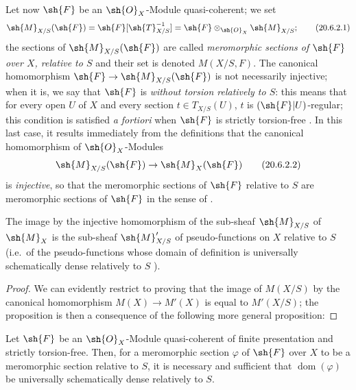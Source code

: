 \begin{env}[20.6.2]
\label{IV.20.6.2}
Let now $\sh{F}$ be an $\sh{O}_X$-Module quasi-coherent;
we set
\[
\label{IV.20.6.2.1}
  \sh{M}_{X/S}(\sh{F})=\sh{F}[\sh{T}_{X/S}^{-1}]=\sh{F}\otimes_{\sh{O}_X}\sh{M}_{X/S};
  \tag{20.6.2.1}
\]
the sections of $\sh{M}_{X/S}(\sh{F})$ are called \emph{meromorphic sections of $\sh{F}$ over $X$, relative to $S$} and their set is denoted $M(X/S,F)$.
The canonical homomorphism $\sh{F}\to\sh{M}_{X/S}(\sh{F})$ is not necessarily injective;
when it is, we say that $\sh{F}$ is \emph{without torsion relatively to $S$}:
this means that for every open $U$ of $X$ and every section $t\in T_{X/S}(U)$, $t$ is $(\sh{F}|U)$-regular;
this condition is satisfied \emph{a fortiori} when $\sh{F}$ is strictly torsion-free .
In this last case, it results immediately from the definitions  that the canonical homomorphism of $\sh{O}_X$-Modules
\[
\label{IV.20.6.2.2}
  \sh{M}_{X/S}(\sh{F})\to\sh{M}_X(\sh{F})
  \tag{20.6.2.2}
\]
is \emph{injective}, so that the meromorphic sections of $\sh{F}$ relative to $S$ are meromorphic sections of $\sh{F}$ in the sense of .
\end{env}

\begin{proposition}[20.6.3]
\label{IV.20.6.3}
The image by the injective homomorphism  of the sub-sheaf $\sh{M}_{X/S}$ of $\sh{M}_X$ is the sub-sheaf $\sh{M}'_{X/S}$ of pseudo-functions on $X$ relative to $S$ (i.e.\ of the pseudo-functions whose domain of definition is universally schematically dense relatively to $S$ ).
\end{proposition}

\begin{proof}
We can evidently restrict to proving that the image of $M(X/S)$ by the canonical homomorphism $M(X)\to M'(X)$ is equal to $M'(X/S)$;
the proposition is then a consequence of the following more general proposition:
\end{proof}

\begin{proposition}[20.6.4]
\label{IV.20.6.4}
Let $\sh{F}$ be an $\sh{O}_X$-Module quasi-coherent of finite presentation and strictly torsion-free.
Then, for a meromorphic section $\varphi$ of $\sh{F}$ over $X$ to be a meromorphic section relative to $S$, it is necessary and sufficient that $\operatorname{dom}(\varphi)$ be universally schematically dense relatively to $S$.
\end{proposition}

